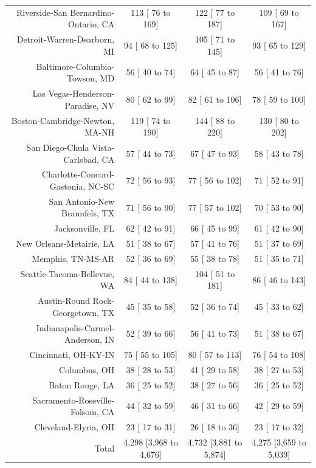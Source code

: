 \documentclass{article}
\begin{document}
\begin{table}[H]
\begin{tabular}{|r|c|c|c|}
		Riverside-San Bernardino-Ontario, CA &   113 [   76 to   169] &   122 [   77 to   187] &   109 [   69 to   167]\\
		Detroit-Warren-Dearborn, MI &    94 [   68 to   125] &   105 [   71 to   145] &    93 [   65 to   129]\\
		Baltimore-Columbia-Towson, MD &    56 [   40 to    74] &    64 [   45 to    87] &    56 [   41 to    76]\\
		Las Vegas-Henderson-Paradise, NV &    80 [   62 to    99] &    82 [   61 to   106] &    78 [   59 to   100]\\
		Boston-Cambridge-Newton, MA-NH &   119 [   74 to   190] &   144 [   88 to   220] &   130 [   80 to   202]\\
		San Diego-Chula Vista-Carlsbad, CA &    57 [   44 to    73] &    67 [   47 to    93] &    58 [   43 to    78]\\
		Charlotte-Concord-Gastonia, NC-SC &    72 [   56 to    93] &    77 [   56 to   102] &    71 [   52 to    91]\\
		San Antonio-New Braunfels, TX &    71 [   56 to    90] &    77 [   57 to   102] &    70 [   53 to    90]\\
		Jacksonville, FL &    62 [   42 to    91] &    66 [   45 to    99] &    61 [   42 to    90]\\
		New Orleans-Metairie, LA &    51 [   38 to    67] &    57 [   41 to    76] &    51 [   37 to    69]\\
		Memphis, TN-MS-AR &    52 [   36 to    69] &    55 [   38 to    78] &    51 [   35 to    71]\\
		Seattle-Tacoma-Bellevue, WA &    84 [   44 to   138] &   104 [   51 to   181] &    86 [   46 to   143]\\
		Austin-Round Rock-Georgetown, TX &    45 [   35 to    58] &    52 [   36 to    74] &    45 [   33 to    62]\\
		Indianapolis-Carmel-Anderson, IN &    52 [   39 to    66] &    56 [   41 to    73] &    51 [   38 to    67]\\
		Cincinnati, OH-KY-IN &    75 [   55 to   105] &    80 [   57 to   113] &    76 [   54 to   108]\\
		Columbus, OH &    38 [   28 to    53] &    41 [   29 to    58] &    38 [   27 to    53]\\
		Baton Rouge, LA &    36 [   25 to    52] &    38 [   27 to    56] &    36 [   25 to    52]\\
		Sacramento-Roseville-Folsom, CA &    44 [   32 to    59] &    46 [   31 to    66] &    42 [   29 to    59]\\
		Cleveland-Elyria, OH &    23 [   17 to    31] &    26 [   18 to    36] &    23 [   17 to    32]\\
		\hline
		Total & 4,298 [3,968 to 4,676] & 4,732 [3,881 to 5,874] & 4,275 [3,659 to 5,039]\\
		\hline
	\end{tabular}
\end{table}
\end{document}
